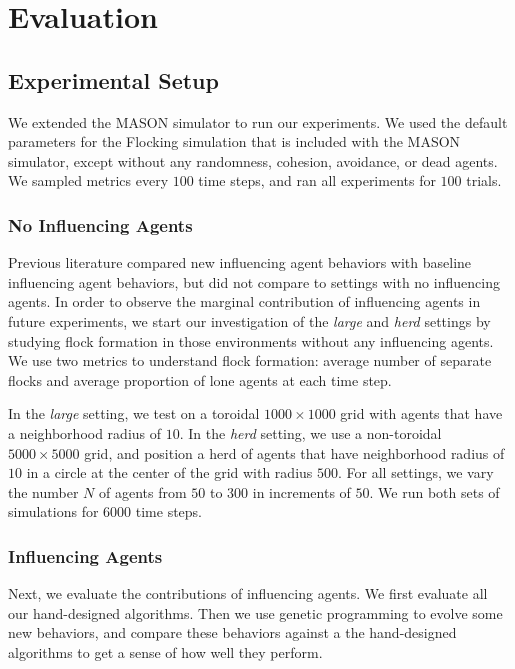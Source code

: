 
\chapter{Evaluation}
\label{ch:evaluation}

\section{Experimental Setup}

We extended the MASON simulator to run our experiments\cite{luke05mason}.
We used the default parameters for the Flocking simulation that is included
with the MASON simulator, except without any randomness, cohesion, avoidance,
or dead agents.
We sampled metrics every $100$ time steps, and ran all experiments for $100$
trials.

\subsection{No Influencing Agents}
Previous literature compared new influencing agent behaviors with baseline
influencing agent behaviors, but did not compare to settings with no
influencing agents.
In order to observe the marginal contribution of influencing agents
in future experiments, we start our investigation of the \textit{large} and
\textit{herd} settings by studying flock formation in those environments
without any influencing agents.
We use two metrics to understand flock formation: average number of separate
flocks and average proportion of lone agents at each time step.

In the \textit{large} setting, we test on a toroidal $1000\times1000$ grid with
agents that have a neighborhood radius of $10$.
In the \textit{herd} setting, we use a non-toroidal $5000\times5000$ grid, and
position a herd of agents that have neighborhood radius of $10$ in a circle at
the center of the grid with radius $500$.
For all settings, we vary the number $N$ of agents from $50$ to $300$ in
increments of $50$.
We run both sets of simulations for $6000$ time steps.

\subsection{Influencing Agents}
Next, we evaluate the contributions of influencing agents.
We first evaluate all our hand-designed algorithms.
Then we use genetic programming to evolve some new behaviors, and compare these
behaviors against a the hand-designed algorithms to get a sense of how well
they perform.

